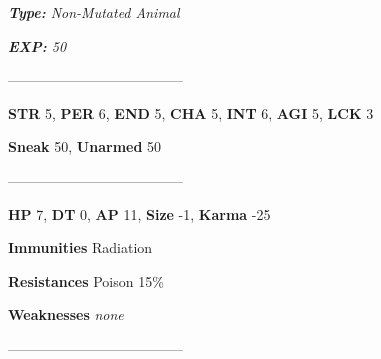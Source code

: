 \documentclass[11pt,a4paper,twocolumn]{book}
\begin{document}
	\noindent
	\emph{\textbf{Type:} Non-Mutated Animal}
	
	\noindent
	\emph{\textbf{EXP:} 50}
	
%		
%	
%		

	--------------------------------------

	\noindent
	\textbf{STR} 5, \textbf{PER} 6, \textbf{END} 5, \textbf{CHA} 5, \textbf{INT} 6, \textbf{AGI} 5, \textbf{LCK} 3
	
	\noindent
	\textbf{Sneak} 50, \textbf{Unarmed} 50
	
	--------------------------------------

	\noindent
	\textbf{HP} 7, \textbf{DT} 0, \textbf{AP} 11, \textbf{Size} -1, \textbf{Karma} -25
	
	
	\noindent
	\textbf{Immunities} Radiation
	
	\noindent
	\textbf{Resistances} Poison 15\%
	
	\noindent
	\textbf{Weaknesses} \emph{none} %
	
	--------------------------------------
	
\end{document}
